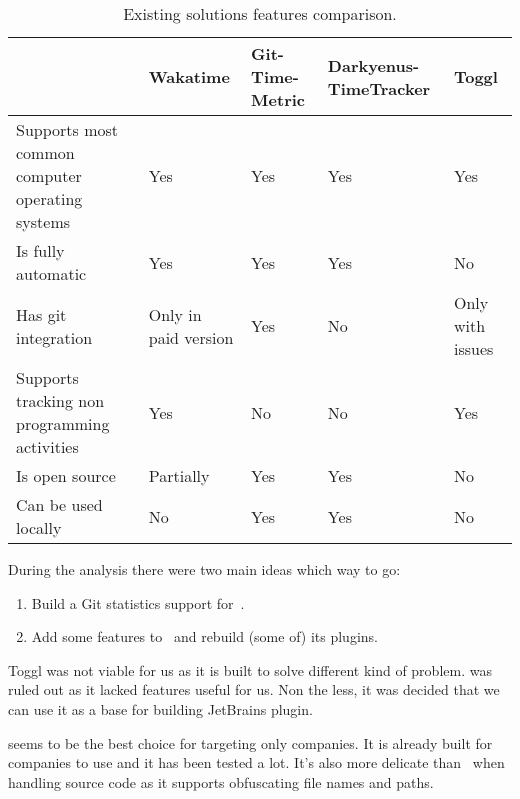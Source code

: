 \begin{table}[h]
    \centering
    \begin{tabular}{ | p{4cm} | p{2.25cm} | p{2.25cm} | p{2.25cm} | p{2.25cm} | }
        \hline
         & Wakatime & Git-Time-Metric & Darkyenus-TimeTracker & Toggl\\
        \hline
        Supports most common computer operating systems & Yes & Yes & Yes & Yes\\
        \hline
        Is fully automatic & Yes & Yes & Yes & No\\
        \hline
        Has git integration & Only in paid version & Yes & No & Only with issues\\
        \hline
        Supports tracking non programming activities & Yes & No & No & Yes\\
        \hline
        Is open source & Partially & Yes & Yes & No\\
        \hline
        Can be used locally & No & Yes & Yes & No\\
        \hline
    \end{tabular}
    \caption{Existing solutions features comparison.}
    \label{tab:comparison-results}
\end{table}

During the analysis there were two main ideas which way to go:
\begin{enumerate}
    \item Build a Git statistics support for~.
    \item Add some features to~ and rebuild (some of) its plugins.
\end{enumerate}

Toggl was not viable for us as it is built to solve different kind of problem.
 was ruled out as it lacked features useful for us.
Non the less, it was decided that we can use it as a base for building JetBrains plugin.

 seems to be the best choice for targeting only companies.
It is already built for companies to use and it has been tested a lot.
It's also more delicate than~ when handling source code as it supports obfuscating file names and paths.

